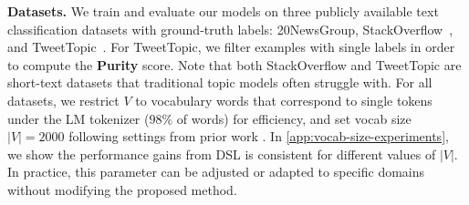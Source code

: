 \documentclass{article}
\theoremstyle{plain}
\theoremstyle{definition}
\theoremstyle{remark}
\begin{document}
\textbf{Datasets.} We train and evaluate our models on three publicly available text classification datasets with ground-truth labels:
20NewsGroup, StackOverflow~\citep{xu-etal-2015-short}, and TweetTopic~\citep{antypas-etal-2022-twitter}.
For TweetTopic, we filter examples with single labels in order to compute the \textbf{Purity} score.
Note that both StackOverflow and TweetTopic are short-text datasets that traditional topic models often struggle with. 
For all datasets, we restrict $V$ to vocabulary words that correspond to single tokens under the LM tokenizer ($98\%$ of words) for efficiency, and set vocab size $|V| = 2000$ following settings from prior work \citep{bianchi-etal-2021-pre}. In \autoref{app:vocab-size-experiments}, we show the performance gains from DSL is consistent for different values of $|V|$. In practice, this parameter can be adjusted or adapted to specific domains without modifying the proposed method.
\end{document}
